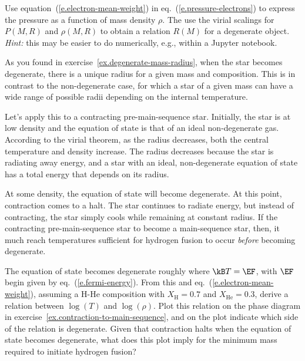 \begin{exercisebox}
\label{ex.degenerate-mass-radius}
Use equation~(\ref{e.electron-mean-weight}) in eq.~(\ref{e.pressure-electrons}) to express the pressure as a function of mass density $\rho$. The use the virial scalings for $P(M,R)$ and $\rho(M,R)$ to obtain a relation $R(M)$ for a degenerate object. \emph{Hint:} this may be easier to do numerically, e.g., within a Jupyter notebook.
\end{exercisebox}

As you found in exercise~\ref{ex.degenerate-mass-radius}, when the star becomes degenerate, there is a unique radius for a given mass and composition. This is in contrast to the non-degenerate case, for which a star of a given mass can have a wide range of possible radii depending on the internal temperature.

Let's apply this to a contracting pre-main-sequence star. Initially, the star is at low density and the equation of state is that of an ideal non-degenerate gas. According to the virial theorem, as the radius decreases, both the central temperature and density increase. 
The radius decreases because the star is radiating away energy, and a star with an ideal, non-degenerate equation of state has a total energy that depends on its radius.

At some density, the equation of state will become degenerate. At this point, contraction comes to a halt. The star continues to radiate energy, but instead of contracting, the star simply cools while remaining at constant radius. If the contracting pre-main-sequence star to become a main-sequence star, then, it much reach temperatures sufficient for hydrogen fusion to occur \emph{before} becoming degenerate.

\begin{exercisebox}
\label{ex.minimum-stellar-mass}
The equation of state becomes degenerate roughly where $\kB T=\EF$, with $\EF$ begin given by eq.~(\ref{e.fermi-energy}). From this and eq.~(\ref{e.electron-mean-weight}), assuming a H-He composition with $X_{\mathrm{H}} = 0.7$ and $X_{\mathrm{He}}=0.3$, derive a relation between $\log(T)$ and $\log(\rho)$. Plot this relation on the phase diagram in exercise~\ref{ex.contraction-to-main-sequence}, and on the plot indicate which side of the relation is degenerate.
Given that contraction halts when the equation of state becomes degenerate, what does this plot imply for the minimum mass required to initiate hydrogen fusion?
\end{exercisebox}

